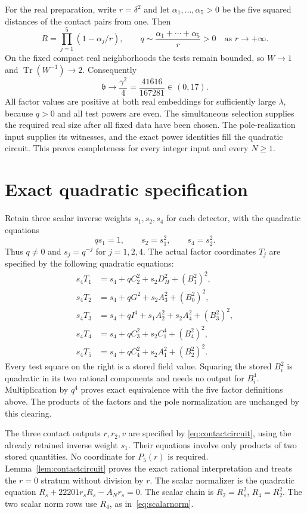 \documentclass[11pt,a4paper]{article}
\DeclareMathOperator{\Tr}{Tr}\DeclareMathOperator{\Nm}{Nm}
\begin{document}
For the real preparation, write $r=\delta^2$ and let
$\alpha_1,\ldots,\alpha_5>0$ be the five squared distances of the
contact pairs from one. Then
\[
 R=\prod_{j=1}^{5}(1-\alpha_j/r),\qquad
 q\sim\frac{\alpha_1+\cdots+\alpha_5}r>0
 \quad\text{as }r\longrightarrow+\infty.
\]
On the fixed compact real neighborhoods the tests remain bounded, so
$W\to1$ and $\Tr(W^{-1})\to2$. Consequently
\[
              \mathfrak b\longrightarrow\frac{\gamma^2}{4}
                              =\frac{41616}{167281}\in(0,17).
\]
All factor values are positive at both real embeddings for sufficiently
large $\lambda$, because $q>0$ and all test powers are even.
The simultaneous selection supplies the required real size after all
fixed data have been chosen. The pole-realization input supplies its
witnesses, and the exact power identities fill the quadratic circuit.
This proves completeness for every integer input and every $N\ge1$.

\section{Exact quadratic specification}
Retain three scalar inverse weights $s_1,s_2,s_4$ for each detector,
with the quadratic equations
\begin{equation}\label{eq:inverseweights}
                 qs_1=1,\qquad s_2=s_1^2,\qquad s_4=s_2^2.
\end{equation}
Thus $q\ne0$ and $s_j=q^{-j}$ for $j=1,2,4$. The actual factor
coordinates $T_j$ are specified by the following quadratic equations:
\begin{equation}\label{eq:clearedfactors}
\begin{split}
 s_4T_1&=s_4+qC_2^2+s_2D_H^2+(B_1^2)^2,\\
 s_4T_2&=s_4+qG^2+s_2A_3^2+(B_0^2)^2,\\
 s_4T_3&=s_4+qI^4+s_1A_2^2+s_2A_4^2+(B_3^2)^2,\\
 s_4T_4&=s_4+qC_3^2+s_2C_1^4+(B_4^2)^2,\\
 s_4T_5&=s_4+qC_4^2+s_2A_1^2+(B_2^2)^2.
\end{split}
\end{equation}
Every test square on the right is a stored field value. Squaring
the stored $B_i^2$ is quadratic in its two rational components and
needs no output for $B_i^4$. Multiplication by $q^4$ proves exact
equivalence with the five factor definitions above. The products of
the factors and the pole normalization are unchanged by this clearing.

The three contact outputs $r,r_2,v$ are specified by
\eqref{eq:contactcircuit}, using the already retained inverse weight
$s_1$. Their equations involve only products of two stored quantities.
No coordinate for $P_5(r)$ is required. Lemma~\ref{lem:contactcircuit}
proves the exact rational interpretation and treats the $r=0$ stratum
without division by $r$.
The scalar normalizer is the quadratic equation
$R_s+22201r_sR_s-A_Nr_s=0$.
The scalar chain is $R_2=R_s^2$, $R_4=R_2^2$.
The two scalar norm rows use $R_4$, as in~\eqref{eq:scalarnorm}.
\end{document}
